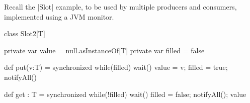













\begin{slide}

Recall the |Slot| example, to be used by multiple producers and consumers,
implemented using a JVM monitor.
%
\begin{scala}
class Slot2[T]{
  private var value = null.asInstanceOf[T]
  private var filled = false

  def put(v:T) = synchronized{
    while(filled) wait()
    value = v; filled = true; notifyAll()
  }

  def get : T = synchronized{
    while(!filled) wait()
    filled = false; notifyAll(); value
  }
}
\end{scala}
\end{slide}

